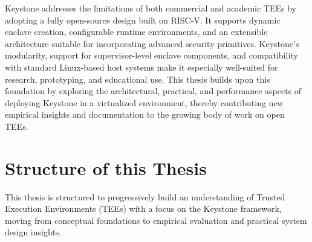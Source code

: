 Keystone addresses the limitations of both commercial and academic TEEs by adopting a fully open-source design built on RISC-V. It supports dynamic enclave creation, configurable runtime environments, and an extensible architecture suitable for incorporating advanced security primitives. Keystone’s modularity, support for supervisor-level enclave components, and compatibility with standard Linux-based host systems make it especially well-suited for research, prototyping, and educational use. This thesis builds upon this foundation by exploring the architectural, practical, and performance aspects of deploying Keystone in a virtualized environment, thereby contributing new empirical insights and documentation to the growing body of work on open TEEs.

\section{Structure of this Thesis}

This thesis is structured to progressively build an understanding of Trusted Execution Environments (TEEs) with a focus on the Keystone framework, moving from conceptual foundations to empirical evaluation and practical system design insights.

